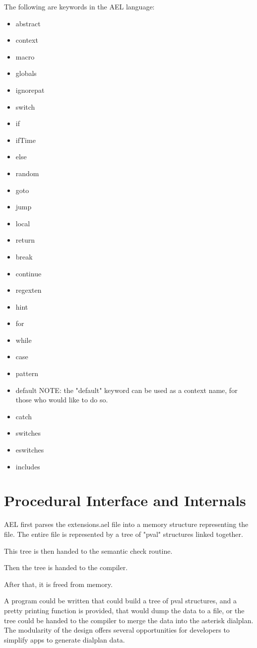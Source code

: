 {The following are keywords in the AEL language:
\begin{itemize}
    \item abstract
    \item context
    \item macro
    \item globals
    \item ignorepat
    \item switch
    \item if
    \item ifTime
    \item else
    \item random
    \item goto
    \item jump
    \item local
    \item return
    \item break
    \item continue
    \item regexten
    \item hint
    \item for
    \item while
    \item case
    \item pattern
    \item default   NOTE: the "default" keyword can be used as a context name,
                      for those who would like to do so.
    \item catch
    \item switches
    \item eswitches
    \item includes
\end{itemize}


\section{Procedural Interface and Internals}

AEL first parses the extensions.ael file into a memory structure representing the file.
The entire file is represented by a tree of "pval" structures linked together.

This tree is then handed to the semantic check routine.

Then the tree is handed to the compiler.

After that, it is freed from memory.

A program could be written that could build a tree of pval structures, and
a pretty printing function is provided, that would dump the data to a file,
or the tree could be handed to the compiler to merge the data into the
asterisk dialplan. The modularity of the design offers several opportunities
for developers to simplify apps to generate dialplan data.


}
